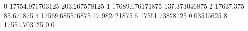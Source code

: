 0 17754.970703125 203.267578125
1 17689.076171875 137.373046875
2 17637.375 85.671875
4 17569.685546875 17.982421875
6 17551.73828125 0.03515625
8 17551.703125 0.0
